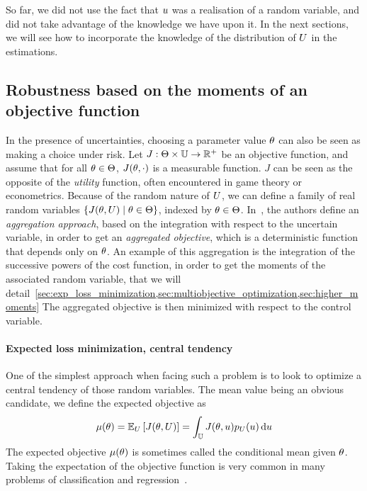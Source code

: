 \documentclass[../../Main_ManuscritThese.tex]{subfiles}
\begin{document}
So far, we did not use the fact that $u$ was a realisation of a random variable, and did not take advantage of the knowledge we have upon it. In the next sections, we will see how to incorporate the knowledge of the distribution of $U$ in the estimations.

\subsection{Robustness based on the moments of an objective function}
In the presence of uncertainties, choosing a parameter value $\theta$ can also be seen as making a choice under risk. Let $J:\Theta \times \mathbb{U}\rightarrow \mathbb{R}^+$ be an objective function, and assume that for all $\theta \in \Theta$, $J(\theta, \cdot)$ is a measurable function.
$J$ can be seen as the opposite of the \emph{utility} function, often encountered in game theory or econometrics.
Because of the random nature of $U$, we can define a family of real random variables $\{J(\theta,U) \mid \theta \in \Theta\}$, indexed by $\theta \in \Theta$.
In~\cite{beyer_robust_2007}, the authors define an \emph{aggregation approach}, based on the integration with respect to the uncertain variable, in order to get an \emph{aggregated objective}, which is a deterministic function that depends only on $\theta$.
An example of this aggregation is the integration of the successive powers of the cost function, in order to get the moments of the associated random variable, that we will detail~\cref{sec:exp_loss_minimization,sec:multiobjective_optimization,sec:higher_moments} %
 The aggregated objective is then minimized with respect to the control variable.
\paragraph{Expected loss minimization, central tendency}
\label{sec:exp_loss_minimization}
One of the simplest approach when facing such a problem is to look to optimize a central tendency of those random variables. The mean value being an obvious candidate, we define the expected objective as
\begin{equation}
  \label{eq:mean_objective}
  \mu(\theta) = \mathbb{E}_U\left[J(\theta,U)\right] =\int_{\mathbb{U}} J(\theta,u)p_U(u)\,\mathrm{d}u
\end{equation}
The expected objective $\mu(\theta)$ is sometimes called the conditional mean given $\theta$. Taking the expectation of the objective function is very common in many problems of classification and regression~\cite{bishop_pattern_2006}.
\end{document}
